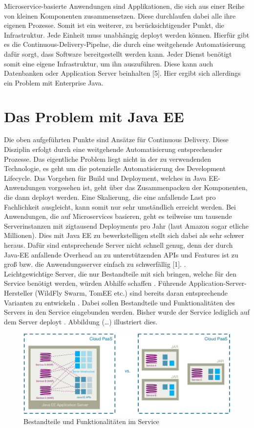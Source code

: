 Microservice-basierte Anwendungen sind Applikationen, die sich aus einer Reihe von kleinen Komponenten zusammensetzen. Diese durchlaufen dabei alle ihre eigenen Prozesse. Somit ist ein weiterer, zu berücksichtigender Punkt, die Infrastruktur. Jede Einheit muss unabhängig deployt werden können. Hierfür gibt es die Continuous-Delivery-Pipelne, die durch eine weitgehende Automatisierung dafür sorgt, dass Software bereitgestellt werden kann. Jeder Dienst benötigt somit eine eigene Infrastruktur, um ihn auszuführen. Diese kann auch Datenbanken oder Application Server beinhalten [5]. Hier ergibt sich allerdings ein Problem mit Enterprise Java.

\section{Das Problem mit Java EE}
Die oben aufgeführten Punkte sind Ansätze für Continuous Delivery. Diese Disziplin erfolgt durch eine weitgehende Automatisierung entsprechender Prozesse. Das eigentliche Problem liegt nicht in der zu verwendenden Technologie, es geht um die potenzielle Automatisierung des Development Lifecycle. Das Vorgehen für Build und Deployment, welches in Java EE-Anwendungen vorgesehen ist, geht über das Zusammenpacken der Komponenten, die dann deployt werden. Eine Skalierung, die eine anfallende Last pro Fachlichkeit ausgleicht, kann somit nur sehr umständlich erreicht werden. Bei Anwendungen, die auf Microservices basieren, geht es teilweise um tausende Serverinstanzen mit zigtausend Deployments pro Jahr (laut Amazon sogar etliche Millionen). Dies mit Java EE zu bewerkstelligen stellt sich dabei als sehr schwer heraus. Dafür sind entsprechende Server nicht schnell genug, denn der durch Java-EE anfallende Overhead an zu unterstützenden APIs und Features ist zu groß bzw. die Anwendungsserver einfach zu schwerfällig [1].  \cite{jaxcenter.2016}. \\ 
Leichtgewichtige Server, die nur Bestandteile mit sich bringen, welche für den Service benötigt werden, würden Abhilfe schaffen \cite{jaxcenter.2016}. Führende Application-Server-Hersteller (WildFly Swarm, TomEE etc.) sind bereits daran entsprechende Varianten zu entwickeln \cite{LarsRowekamp.2016}. Dabei sollen Bestandteile und Funktionalitäten des Servers in den Service eingebunden werden. Bisher wurde der Service lediglich auf dem Server deployt \cite{jaxcenter.2016}. Abbildung (…) illustriert dies.
\begin{figure}[h!]
	\centering
	\includegraphics[width=1.0\linewidth]{images/mp}
	\caption{Bestandteile und Funktionalitäten im Service \cite{jaxcenter.2016}}
	\label{fig:mp}
\end{figure}

